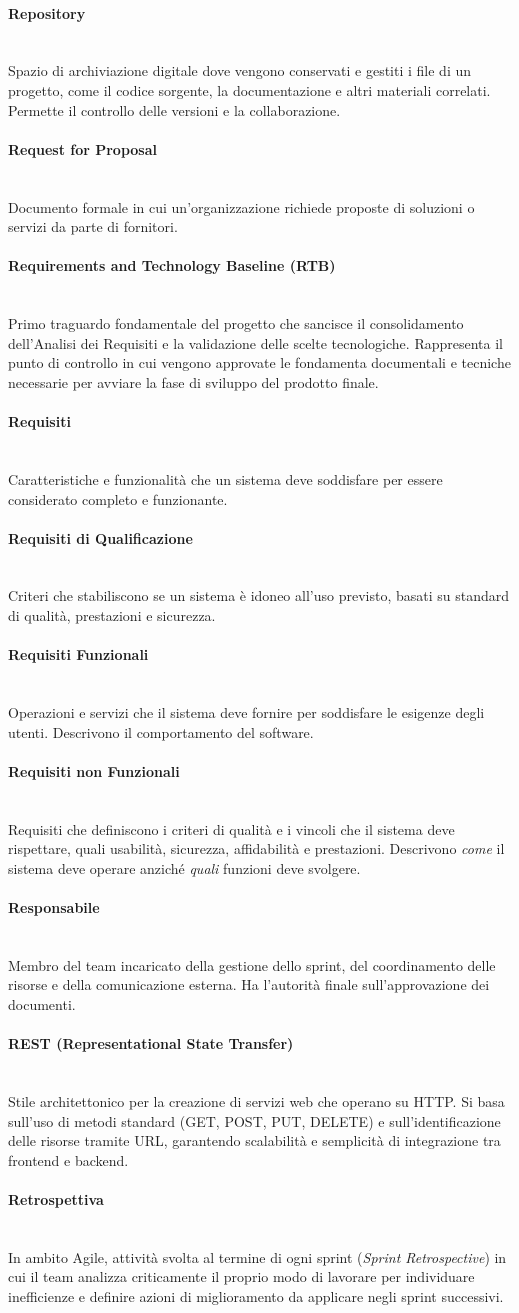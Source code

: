\documentclass[a4paper, 10pt, colorlinks=true, linkcolor=black, urlcolor=blue, citecolor=blue, hidelinks]{article}
\newcommand{\glossaryterm}[2]{
    \paragraph{#1 \label{term:#1}} \mbox{} \\
    #2
    \vspace{0.5em}
}
\begin{document}
\glossaryterm{Repository}{Spazio di archiviazione digitale dove vengono conservati e gestiti i file di un progetto, come il codice sorgente, la documentazione e altri materiali correlati. Permette il controllo delle versioni e la collaborazione.}

\glossaryterm{Request for Proposal}{Documento formale in cui un'organizzazione richiede proposte di soluzioni o servizi da parte di fornitori.}

\glossaryterm{Requirements and Technology Baseline (RTB)}{Primo traguardo fondamentale del progetto che sancisce il consolidamento dell'Analisi dei Requisiti e la validazione delle scelte tecnologiche. Rappresenta il punto di controllo in cui vengono approvate le fondamenta documentali e tecniche necessarie per avviare la fase di sviluppo del prodotto finale.}

\glossaryterm{Requisiti}{Caratteristiche e funzionalità che un sistema deve soddisfare per essere considerato completo e funzionante.}

\glossaryterm{Requisiti di Qualificazione}{Criteri che stabiliscono se un sistema è idoneo all'uso previsto, basati su standard di qualità, prestazioni e sicurezza.}

\glossaryterm{Requisiti Funzionali}{Operazioni e servizi che il sistema deve fornire per soddisfare le esigenze degli utenti. Descrivono il comportamento del software.}

\glossaryterm{Requisiti non Funzionali}{Requisiti che definiscono i criteri di qualità e i vincoli che il sistema deve rispettare, quali usabilità, sicurezza, affidabilità e prestazioni. Descrivono \textit{come} il sistema deve operare anziché \textit{quali} funzioni deve svolgere.}

\glossaryterm{Responsabile}{Membro del team incaricato della gestione dello sprint, del coordinamento delle risorse e della comunicazione esterna. Ha l'autorità finale sull'approvazione dei documenti.}

\glossaryterm{REST (Representational State Transfer)}{Stile architettonico per la creazione di servizi web che operano su HTTP. Si basa sull'uso di metodi standard (GET, POST, PUT, DELETE) e sull'identificazione delle risorse tramite URL, garantendo scalabilità e semplicità di integrazione tra frontend e backend.}

\glossaryterm{Retrospettiva}{In ambito Agile, attività svolta al termine di ogni sprint (\textit{Sprint Retrospective}) in cui il team analizza criticamente il proprio modo di lavorare per individuare inefficienze e definire azioni di miglioramento da applicare negli sprint successivi.}
\end{document}
